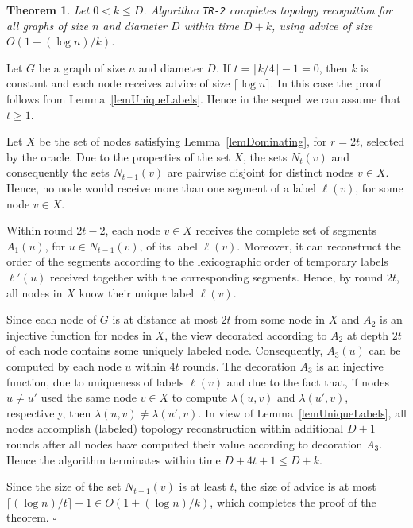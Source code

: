 \documentclass{article}
\newcommand*{\qed}{\hfill\ensuremath{\square}}
\newtheorem{theorem}{Theorem}[section]
\newenvironment{proof}{\noindent{\bf Proof:}}{\qed}
\begin{document}
\begin{theorem}\label{ubTimeD+k}
Let $0<k\le D$.
Algorithm {\tt TR-2} completes topology recognition for all graphs of size $n$ and diameter $D$ within time $D+k$, using advice of size $O(1+ (\log n)/ k)$.
\end{theorem}
\begin{proof}
Let $G$ be a graph of size $n$ and diameter $D$. If $t=\lceil k/4\rceil -1=0$, then $k$ is constant and each node receives advice of size $\lceil \log n\rceil$. In this case the proof follows from Lemma~\ref{lemUniqueLabels}.
Hence in the sequel we can assume that $t\ge 1$.

Let $X$ be the set of nodes satisfying Lemma~\ref{lemDominating}, for $r=2t$,  selected by the oracle.
Due to the properties of the set $X$, the sets $N_{t}(v)$ and consequently the sets $N_{t-1}(v)$
are pairwise disjoint for distinct nodes $v\in X$.
Hence, no node would receive more than one segment of a label $\ell(v)$, for some node $v\in X$.

Within round $2t-2$, each node $v\in X$ receives the complete set of segments $A_1(u)$,  for $u\in N_{t-1}(v)$, of its label $\ell(v)$.
Moreover, it can reconstruct the order of the segments according to the lexicographic order of temporary labels $\ell'(u)$ received together with the corresponding segments. 
Hence, by round $2t$, all nodes in $X$ know their unique label $\ell(v)$.

Since each node of $G$ is at distance at most $2t$ from some node in $X$ and $A_2$ is an injective function for nodes in $X$, the view decorated according to $A_2$ at depth $2t$ of each node contains some uniquely labeled node.
Consequently, $A_3(u)$ can be computed by each node $u$ within $4t$ rounds.
The decoration $A_3$ is an injective function, due to uniqueness of labels $\ell(v)$ and due to the fact that, if nodes $u\ne u'$ used the same node $v\in X$ to compute $\lambda(u,v)$ and  $\lambda(u',v)$, respectively, then $\lambda(u,v)\ne \lambda(u',v)$.
In view of  Lemma~\ref{lemUniqueLabels}, all nodes accomplish (labeled) topology reconstruction within additional $D+1$ rounds after all nodes have computed their value according to decoration $A_3$. Hence the algorithm terminates within time $D+4t+1\le D+k$.

Since the size of the set  $N_{t-1}(v)$ is at least $t$, the size of advice is at most 
$\lceil ( \log n)  / t\rceil +1 \in O(1+(\log n) / k)$, which completes the proof of the theorem.
\end{proof}
\end{document}
